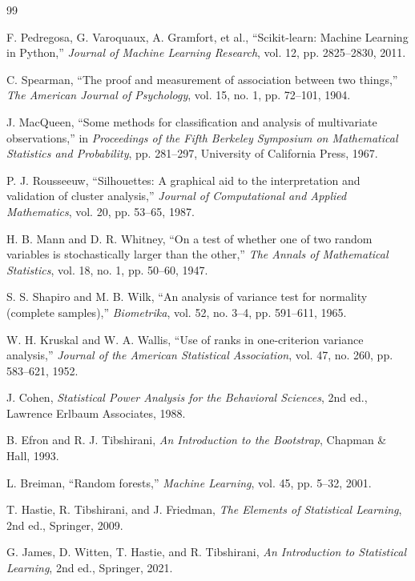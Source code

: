 \documentclass[11pt,a4paper]{article}
\begin{document}
\begin{thebibliography}{99}

F. Pedregosa, G. Varoquaux, A. Gramfort, et al.,
``Scikit-learn: Machine Learning in Python,''
\textit{Journal of Machine Learning Research}, vol. 12, pp. 2825--2830, 2011.

C. Spearman,
``The proof and measurement of association between two things,''
\textit{The American Journal of Psychology}, vol. 15, no. 1, pp. 72--101, 1904.

J. MacQueen,
``Some methods for classification and analysis of multivariate observations,''
in \textit{Proceedings of the Fifth Berkeley Symposium on Mathematical Statistics and Probability}, pp. 281--297, University of California Press, 1967.

P. J. Rousseeuw,
``Silhouettes: A graphical aid to the interpretation and validation of cluster analysis,''
\textit{Journal of Computational and Applied Mathematics}, vol. 20, pp. 53--65, 1987.

H. B. Mann and D. R. Whitney,
``On a test of whether one of two random variables is stochastically larger than the other,''
\textit{The Annals of Mathematical Statistics}, vol. 18, no. 1, pp. 50--60, 1947.

S. S. Shapiro and M. B. Wilk,
``An analysis of variance test for normality (complete samples),''
\textit{Biometrika}, vol. 52, no. 3--4, pp. 591--611, 1965.

W. H. Kruskal and W. A. Wallis,
``Use of ranks in one-criterion variance analysis,''
\textit{Journal of the American Statistical Association}, vol. 47, no. 260, pp. 583--621, 1952.

J. Cohen,
\textit{Statistical Power Analysis for the Behavioral Sciences}, 2nd ed., Lawrence Erlbaum Associates, 1988.

B. Efron and R. J. Tibshirani,
\textit{An Introduction to the Bootstrap}, Chapman \& Hall, 1993.

L. Breiman,
``Random forests,''
\textit{Machine Learning}, vol. 45, pp. 5--32, 2001.

T. Hastie, R. Tibshirani, and J. Friedman,
\textit{The Elements of Statistical Learning}, 2nd ed., Springer, 2009.

G. James, D. Witten, T. Hastie, and R. Tibshirani,
\textit{An Introduction to Statistical Learning}, 2nd ed., Springer, 2021.

\end{thebibliography}
\end{document}
